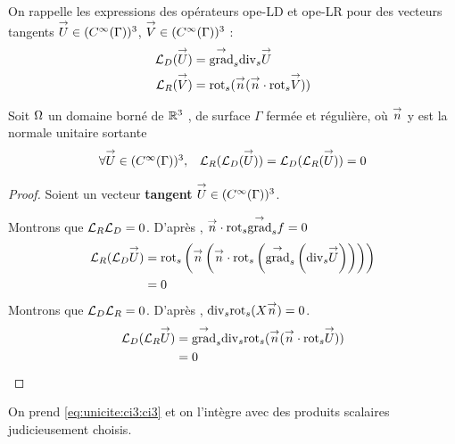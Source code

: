 			On rappelle les expressions des opérateurs \gls{ope-LD} et \gls{ope-LR} pour des vecteurs tangents \(\vect U \in (C^\infty(\Gamma))^3\), \( \vect V \in (C^\infty(\Gamma))^3\) :
			\begin{align*}
				\LD(\vect U) &= \tgrads \tdivs \vect U\\
				\LR(\vect V) &= \trots( \vn ( \vn \cdot \trots \vect V))\\
			\end{align*}
			\begin{prop}
				Soit \(\OO\) un domaine borné de \(\RR^3\) , de surface \(\Gamma\) fermée et régulière, où \(\vect n\) y est la normale unitaire
				sortante
				\begin{equation}
					\begin{matrix}
						\forall \vect U \in (C^\infty(\Gamma))^3 ,& \LR(\LD(\vect U)) = \LD(\LR(\vect U)) = 0
					\end{matrix}
				\end{equation}
			\end{prop}
			\begin{proof}
				Soient un vecteur \textbf{tangent} \(\vect U \in (C^\infty(\Gamma))^3\).

				Montrons que \(\LR\LD = 0\). D’après \cite[p.~1029, A3.42]{bladel_electromagnetic_2007}, \(\vn \cdot \trots\tgrads f = 0\)
				\begin{align*}
					\LR(\LD \vect U)  &= \trots \left(\vn \left(\vn \cdot \trots \left( \tgrads \left(\tdivs \vect U\right)\right)\right)\right) \\
					&= 0
				\end{align*}
				Montrons que \(\LD\LR = 0\). D’après \cite[p.~1029, A3.43]{bladel_electromagnetic_2007}, \(\tdivs \trots (X\vn) = 0\).
				\begin{align*}
					\LD(\LR \vect U) &= \tgrads \tdivs \trots (\vn (\vn \cdot \trots \vect U)) \\
					&= 0
				\end{align*}
			\end{proof}


			On prend \eqref{eq:unicite:ci3:ci3} et on l’intègre avec des produits scalaires judicieusement choisis.


